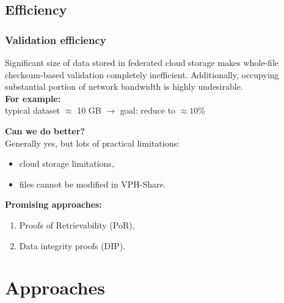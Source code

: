 \documentclass[compress]{beamer}
\begin{document}
\subsection{Efficiency}
\begin{frame}
\frametitle{\textbf{Validation efficiency}}
\begin{block}{}
Significant size of data stored in federated cloud storage makes whole-file checksum-based validation completely inefficient. 
Additionally, occupying substantial portion of network bandwidth is highly undesirable.\\
\textbf{For example:}\\
typical dataset $\approx$ 10 GB $\rightarrow$ goal: reduce to $\approx 10\%$
\end{block}
\begin{exampleblock}{}
\textbf{Can we do better?}\\
Generally yes, but lots of practical limitations:
\begin{itemize}
	\item cloud storage limitations,
	\item files cannot be modified in VPH-Share.
\end{itemize}
\textbf{Promising approaches:}\\
\begin{enumerate}
	\item Proofs of Retrievability (PoR),
	\item Data integrity proofs (DIP).
\end{enumerate}
\end{exampleblock}
\end{frame}

\section{Approaches}
\end{document}

